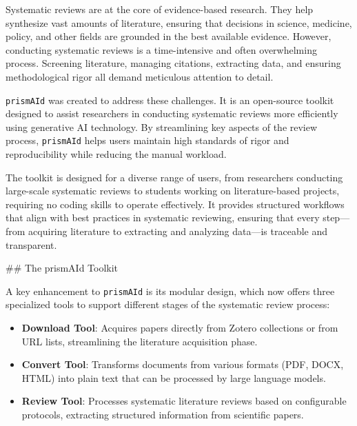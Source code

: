 \label{chap:intro}

Systematic reviews are at the core of evidence-based research. They help synthesize vast amounts of literature, ensuring that decisions in science, medicine, policy, and other fields are grounded in the best available evidence. However, conducting systematic reviews is a time-intensive and often overwhelming process. Screening literature, managing citations, extracting data, and ensuring methodological rigor all demand meticulous attention to detail.

\texttt{prismAId} was created to address these challenges. It is an open-source toolkit designed to assist researchers in conducting systematic reviews more efficiently using generative AI technology. By streamlining key aspects of the review process, \texttt{prismAId} helps users maintain high standards of rigor and reproducibility while reducing the manual workload.

The toolkit is designed for a diverse range of users, from researchers conducting large-scale systematic reviews to students working on literature-based projects, requiring no coding skills to operate effectively. It provides structured workflows that align with best practices in systematic reviewing, ensuring that every step—from acquiring literature to extracting and analyzing data—is traceable and transparent.

\bigskip

## The prismAId Toolkit

A key enhancement to \texttt{prismAId} is its modular design, which now offers three specialized tools to support different stages of the systematic review process:

\begin{itemize}
    \item \textbf{Download Tool}: Acquires papers directly from Zotero collections or from URL lists, streamlining the literature acquisition phase.

    \item \textbf{Convert Tool}: Transforms documents from various formats (PDF, DOCX, HTML) into plain text that can be processed by large language models.

    \item \textbf{Review Tool}: Processes systematic literature reviews based on configurable protocols, extracting structured information from scientific papers.
\end{itemize}

